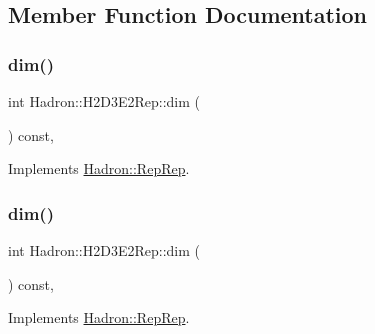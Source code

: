 \subsection{Member Function Documentation}
\mbox{\label{structHadron_1_1H2D3E2Rep_ad034b5f609721e406b181c1e1e66ca4a}} 
\subsubsection{\texorpdfstring{dim()}{dim()}\hspace{0.1cm}{\footnotesize\ttfamily [1/5]}}
{\footnotesize\ttfamily int Hadron\+::\+H2\+D3\+E2\+Rep\+::dim (\begin{DoxyParamCaption}{ }\end{DoxyParamCaption}) const\hspace{0.3cm}{\ttfamily [inline]}, {\ttfamily [virtual]}}



Implements \mbox{\hyperlink{structHadron_1_1RepRep_a92c8802e5ed7afd7da43ccfd5b7cd92b}{Hadron\+::\+Rep\+Rep}}.

\mbox{\label{structHadron_1_1H2D3E2Rep_ad034b5f609721e406b181c1e1e66ca4a}} 
\subsubsection{\texorpdfstring{dim()}{dim()}\hspace{0.1cm}{\footnotesize\ttfamily [2/5]}}
{\footnotesize\ttfamily int Hadron\+::\+H2\+D3\+E2\+Rep\+::dim (\begin{DoxyParamCaption}{ }\end{DoxyParamCaption}) const\hspace{0.3cm}{\ttfamily [inline]}, {\ttfamily [virtual]}}



Implements \mbox{\hyperlink{structHadron_1_1RepRep_a92c8802e5ed7afd7da43ccfd5b7cd92b}{Hadron\+::\+Rep\+Rep}}.

\mbox{\label{structHadron_1_1H2D3E2Rep_ad034b5f609721e406b181c1e1e66ca4a}} 
